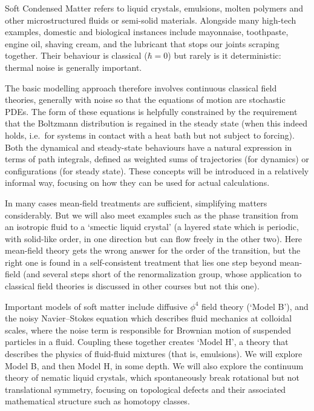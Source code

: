 \documentclass[a4paper]{article}
\begin{document}
\maketitle
{\small
\setlength{\parindent}{0em}
\setlength{\parskip}{1em}
Soft Condensed Matter refers to liquid crystals, emulsions, molten polymers and other microstructured fluids or semi-solid materials. Alongside many high-tech examples, domestic and biological instances include mayonnaise, toothpaste, engine oil, shaving cream, and the lubricant that stops our joints scraping together. Their behaviour is classical ($\hbar = 0$) but rarely is it deterministic: thermal noise is generally important.

The basic modelling approach therefore involves continuous classical field theories, generally with noise so that the equations of motion are stochastic PDEs. The form of these equations is helpfully constrained by the requirement that the Boltzmann distribution is regained in the steady state (when this indeed holds, i.e.\ for systems in contact with a heat bath but not subject to forcing). Both the dynamical and steady-state behaviours have a natural expression in terms of path integrals, defined as weighted sums of trajectories (for dynamics) or configurations (for steady state). These concepts will be introduced in a relatively informal way, focusing on how they can be used for actual calculations.

In many cases mean-field treatments are sufficient, simplifying matters considerably. But we will also meet examples such as the phase transition from an isotropic fluid to a `smectic liquid crystal' (a layered state which is periodic, with solid-like order, in one direction but can flow freely in the other two). Here mean-field theory gets the wrong answer for the order of the transition, but the right one is found in a self-consistent treatment that lies one step beyond mean-field (and several steps short of the renormalization group, whose application to classical
field theories is discussed in other courses but not this one).

Important models of soft matter include diffusive $\phi^4$ field theory (`Model B'), and the noisy Navier--Stokes equation which describes fluid mechanics at colloidal scales, where the noise term is responsible for Brownian motion of suspended particles in a fluid. Coupling these together creates `Model H', a theory that describes the physics of fluid-fluid mixtures (that is, emulsions). We will explore Model B, and then Model H, in some depth. We will also explore the continuum theory of nematic liquid crystals, which spontaneously break rotational but not translational symmetry, focusing on topological defects and their associated mathematical structure such as homotopy classes.

}
\end{document}
